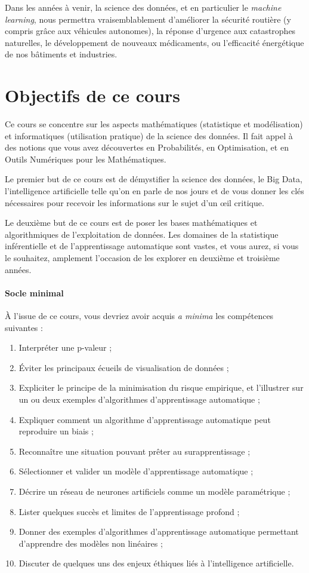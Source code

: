 Dans les années à venir, la science des données, et en particulier le
\textit{machine learning}, nous permettra vraisemblablement d'améliorer la
sécurité routière (y compris grâce aux véhicules autonomes), la réponse
d'urgence aux catastrophes naturelles, le développement de nouveaux
médicaments, ou l'efficacité énergétique de nos bâtiments et industries.



\section{Objectifs de ce cours}
Ce cours se concentre sur les aspects mathématiques (statistique et
modélisation) et informatiques (utilisation pratique) de la science des
données. Il fait appel à des notions que vous avez découvertes en Probabilités,
en Optimisation, et en Outils Numériques pour les Mathématiques.

Le premier but de ce cours est de démystifier la science des données, le Big
Data, l'intelligence artificielle telle qu'on en parle de nos jours et de vous
donner les clés nécessaires pour recevoir les informations sur le sujet d'un
\oe{}il critique.

Le deuxième but de ce cours est de poser les bases mathématiques et
algorithmiques de l'exploitation de données. Les domaines de la statistique
inférentielle et de l'apprentissage automatique sont vastes, et vous aurez, si
vous le souhaitez, amplement l'occasion de les explorer en deuxième et troisième
années.

\paragraph{Socle minimal} 
À l'issue de ce cours, vous devriez avoir acquis
\textit{a minima} les compétences suivantes :
\begin{enumerate}
\item Interpréter une p-valeur ;
\item Éviter les principaux écueils de visualisation de données ;
\item Expliciter le principe de la minimisation du risque empirique, et
  l'illustrer sur un ou deux ex\-emples d'algorithmes d'apprentissage automatique ;
\item Expliquer comment un algorithme d'apprentissage automatique peut
  reproduire un biais  ;
\item Reconnaître une situation pouvant prêter au surapprentissage ;
\item Sélectionner et valider un modèle d'apprentissage automatique ;
\item Décrire un réseau de neurones artificiels comme un modèle paramétrique ;
\item Lister quelques succès et limites de l'apprentissage profond ;
\item Donner des exemples d'algorithmes d'apprentissage automatique permettant
  d'apprendre des modèles non linéaires ;
\item Discuter de quelques uns des enjeux éthiques liés à l'intelligence
  artificielle.
\end{enumerate}

